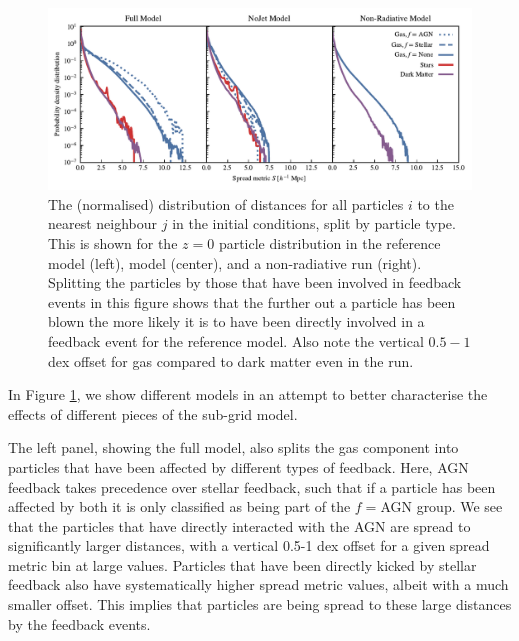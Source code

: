 \begin{figure}
    \centering
    \includegraphics[width=\textwidth]{figures/neighbour_analysis_feedback_histogram_combined.pdf}
    \vspace{-0.7cm}
    \caption{The (normalised) distribution of distances for all particles
    $i$ to the nearest neighbour $j$ in the initial conditions, split by
    particle type. This is shown for the $z=0$ particle distribution in the
    reference model (left), \nojet{} model (center), and a non-radiative run
    (right). Splitting the particles by those that have been involved in
    feedback events in this figure shows that the further out a particle has
    been blown the more likely it is to have been directly involved in a
    feedback event for the reference model. Also note the vertical $0.5-1$
    dex offset for gas compared to dark matter even in the \nojet{} run.
    }\label{fig:feedbackdistance}
\end{figure}

In Figure \ref{fig:feedbackdistance}, we show different models in an
attempt to better characterise the effects of different pieces of the
\simba{} sub-grid model.

The left panel, showing the full \simba{} model, also splits the 
gas component into particles that have been affected by different
types of feedback. Here, AGN feedback takes precedence over stellar
feedback, such that if a particle has been affected by both it is only
classified as being part of the $f=$AGN group. We see that the particles
that have directly interacted with the AGN are spread to significantly 
larger distances, with a vertical 0.5-1 dex offset for a given spread
metric bin at large values. Particles that have been directly kicked by
stellar feedback also have systematically higher spread metric values,
albeit with a much smaller offset. This implies that particles are being
spread to these large distances by the feedback events.

